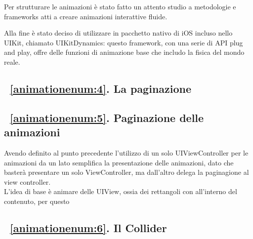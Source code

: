 Per strutturare le animazioni è stato fatto un attento studio a metodologie e frameworks
atti a creare animazioni interattive fluide.

Alla fine è stato deciso di utilizzare in pacchetto
nativo di iOS incluso nello UIKit\cite{uikit}, chiamato UIKitDynamics\cite{uidynamics}: questo framework, con una serie di API 
plug and play, offre delle funzioni di animazione base che includo la fisica del mondo reale.

\subsection{~\ref{animationenum:4}. La paginazione}

\subsection{~\ref{animationenum:5}. Paginazione delle animazioni}

Avendo definito al punto precedente l'utilizzo di un solo UIViewController per le animazioni da un lato semplifica
la presentazione delle animazioni, dato che basterà presentare un solo ViewController, ma dall'altro delega
la paginagione al view controller. \\

L'idea di base è animare delle UIView, ossia dei rettangoli con all'interno del contenuto, per questo 

\subsection{~\ref{animationenum:6}. Il Collider}

